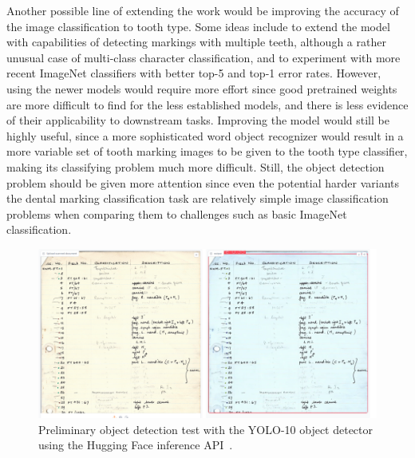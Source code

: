 \documentclass[english,twoside,openright]{UH_DS_MSc}
\begin{document}
Another possible line of extending the work would be improving the accuracy of the image classification to tooth type. 
Some ideas include to extend the model with capabilities of detecting markings with multiple teeth, although
a rather unusual case of multi-class character classification, and to experiment with more recent ImageNet classifiers with better top-5 and top-1 error rates.
However, using the newer models would require more effort since good pretrained weights are 
more difficult to find for the less established models, and there is less evidence of their applicability to downstream tasks.
Improving the model would still be highly useful, since a more sophisticated word object recognizer would result in a more 
variable set of tooth marking images to be given to the tooth type classifier, making its classifying problem much more difficult. 
Still, the object detection problem should be given more attention since even the 
potential harder variants the dental marking classification task are relatively simple image classification problems when comparing 
them to challenges such as basic ImageNet classification.

\begin{figure}[h]
    \centering
    \includegraphics*[scale=0.3]{images/yoloresult.png}
    \caption{Preliminary object detection test with the YOLO-10 object detector using the Hugging Face inference API~\cite{OmouredYOLOv10DocumentLayoutAnalysisHugging2023}.}
    \label{image:yolo}
\end{figure}
\end{document}
